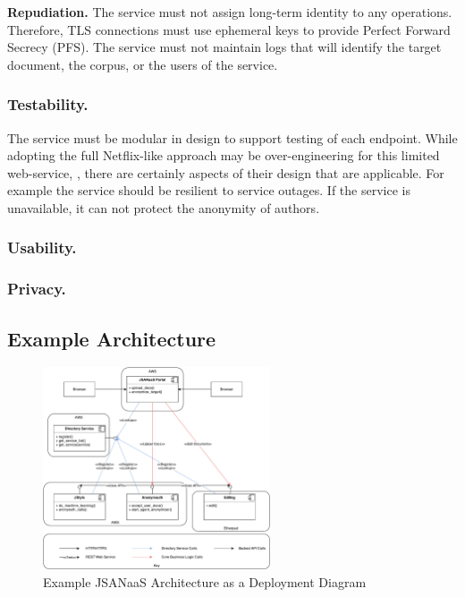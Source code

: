 \documentclass[letterpaper]{article}
\begin{document}
{\bf Repudiation.}  The service must not assign long-term identity
to any operations.  Therefore, TLS connections must use ephemeral
keys to provide Perfect Forward Secrecy (PFS).  The service must not
maintain logs that will identify the target document, the corpus, or
the users of the service.

\subsubsection{Testability.}

The service must be modular in design to support testing of each
endpoint.  While adopting the full Netflix-like approach may be
over-engineering for this limited web-service,
\cite{Tseitlin:2013:AO:2492007.2492022}, there are certainly aspects
of their design that are applicable.  For example the service should
be resilient to service outages.  If the service is unavailable, it
can not protect the anonymity of authors.

\subsubsection{Usability.}

\subsubsection{Privacy.}

\subsection{Example Architecture}

\begin{figure}
  \centering
    \includegraphics[width=0.6\textwidth]{img/jsanaas.pdf}
  \caption{Example JSANaaS Architecture as a Deployment Diagram}
  \label{fig:jsanaas}
\end{figure}
\end{document}
